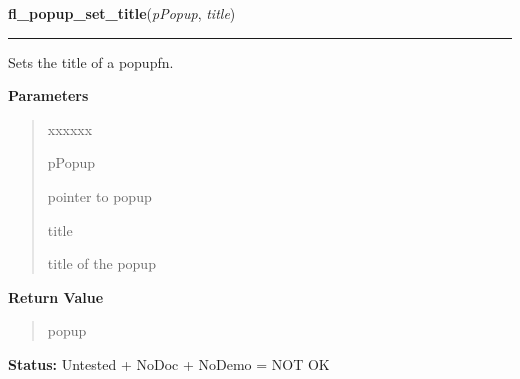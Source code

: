 \hspace{.8\funcindent}\begin{boxedminipage}{\funcwidth}

    \raggedright \textbf{fl\_popup\_set\_title}(\textit{pPopup}, \textit{title})

    \vspace{-1.5ex}

    \rule{\textwidth}{0.5\fboxrule}
\setlength{\parskip}{2ex}
    Sets the title of a popupfn.

\setlength{\parskip}{1ex}
      \textbf{Parameters}
      \vspace{-1ex}

      \begin{quote}
        \begin{Ventry}{xxxxxx}

          \item[pPopup]

          pointer to popup

          \item[title]

          title of the popup

        \end{Ventry}

      \end{quote}

      \textbf{Return Value}
    \vspace{-1ex}

      \begin{quote}
      popup

      \end{quote}

\textbf{Status:} Untested + NoDoc + NoDemo = NOT OK



    \end{boxedminipage}

    \label{xformslib:flpopup:fl_popup_entry_set_callback}

    \vspace{0.5ex}

